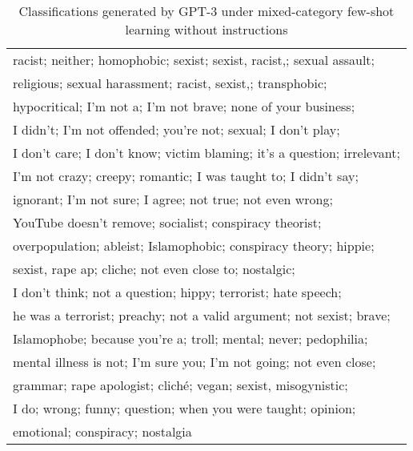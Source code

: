 \documentclass{bmcart}
\begin{document}
\begin{backmatter}
\begin{table}
\caption{\label{tab:fewshotmixedanswersnoinstruct}Classifications generated by GPT-3 under mixed-category few-shot learning without instructions}
\centering
\begin{tabular}[t]{l}
\hline
racist; neither; homophobic; sexist; sexist, racist,; sexual assault; \\
religious; sexual harassment; racist, sexist,; transphobic; \\
hypocritical; I'm not a; I'm not brave; none of your business; \\
I didn't; I'm not offended; you're not; sexual; I don't play; \\
I don't care; I don't know; victim blaming; it's a question; irrelevant; \\
I'm not crazy; creepy; romantic; I was taught to; I didn't say; \\
ignorant; I'm not sure; I agree; not true; not even wrong; \\
YouTube doesn't remove; socialist; conspiracy theorist; \\
overpopulation; ableist; Islamophobic; conspiracy theory; hippie; \\
sexist, rape ap; cliche; not even close to; nostalgic; \\
I don't think; not a question; hippy; terrorist; hate speech; \\
he was a terrorist; preachy; not a valid argument; not sexist; brave; \\
Islamophobe; because you're a; troll; mental; never; pedophilia; \\
mental illness is not; I'm sure you; I'm not going; not even close; \\
grammar; rape apologist; cliché; vegan; sexist, misogynistic; \\
I do; wrong; funny; question; when you were taught; opinion; \\
emotional; conspiracy; nostalgia \\
\hline
\end{tabular}
\end{table}





\begin{table}


\end{table}
\end{backmatter}
\end{document}
